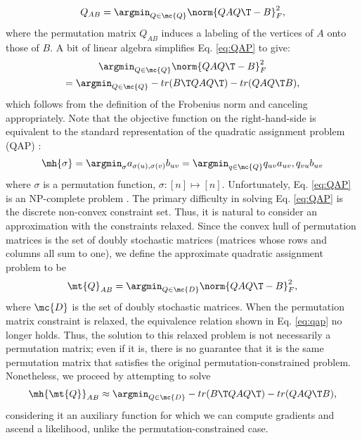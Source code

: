 \documentclass[10pt,journal,cspaper,compsoc]{IEEEtran}
\begin{document}
 \begin{align} \label{eq:QAP}
	Q_{AB}= \argmin_{Q \in \mc{Q}} \norm{Q A Q\T - B}^2_F,
\end{align}
where the permutation matrix $Q_{AB}$ induces a labeling of the vertices of $A$ onto those of $B$. A bit of linear algebra simplifies Eq. \eqref{eq:QAP} to give: %
\begin{multline} \label{eq:qap}
	\argmin_{Q \in \mc{Q}} \norm{Q A Q\T - B}^2_F \nonumber \\
	= \argmin_{Q \in \mc{Q}} - tr(B\T QAQ\T) - tr(QAQ\T B),			
\end{multline}
which follows from the definition of the Frobenius norm and canceling appropriately.  Note that the objective function on the right-hand-side is equivalent to the standard representation of the quadratic assignment problem (QAP) \cite{Conte2004}:
\begin{align}
	\mh{\sigma}= \argmin_{\sigma} a_{\sigma(u), \sigma(v)} b_{uv} = \argmin_{q \in \mc{Q}} q_{uv} a_{uv}, q_{vu} b_{uv}
\end{align}
where $\sigma$ is a permutation function, $\sigma: [n] \mapsto [n]$.  Unfortunately, Eq. \eqref{eq:QAP} is an NP-complete problem \cite{Garey1979}. The primary difficulty in solving Eq. \eqref{eq:QAP} is the discrete non-convex constraint set.  Thus, it is natural to consider an approximation with the constraints relaxed.  Since the convex hull of permutation matrices is the set of doubly stochastic matrices (matrices whose rows and columns all sum to one), we define the approximate quadratic assignment problem to be
\begin{align} \label{eq:tqap}
	\mt{Q}_{AB}= \argmin_{Q \in \mc{D}} \norm{Q A Q\T - B}^2_F,
\end{align}
where $\mc{D}$ is the set of doubly stochastic matrices.  When the permutation matrix constraint is relaxed, the equivalence relation shown in Eq. \eqref{eq:qap} no longer holds.  
Thus, the solution to this relaxed problem is not necessarily a permutation matrix; even if it is, there is no guarantee that it is the same permutation matrix that satisfies the original permutation-constrained problem. Nonetheless, we proceed by attempting to solve
\begin{align} \label{eq:nqap}
	\mh{\mt{Q}}_{AB} \approx \argmin_{Q \in \mc{D}} - tr(B\T QAQ\T) - tr(QAQ\T B),
\end{align}
considering it an auxiliary function for which we can compute gradients and ascend a likelihood, unlike the permutation-constrained case.  
\end{document}
